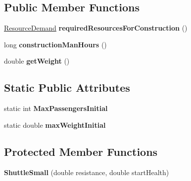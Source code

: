 \subsection*{Public Member Functions}
\begin{DoxyCompactItemize}
\item 
\hyperlink{classuniverse_1_1_resource_demand}{Resource\+Demand} {\bfseries required\+Resources\+For\+Construction} ()\hypertarget{classtools_1_1vehicles_1_1space_1_1_shuttle_small_a18f2b21e366f91dd860d8c3a95e6c82a}{}\label{classtools_1_1vehicles_1_1space_1_1_shuttle_small_a18f2b21e366f91dd860d8c3a95e6c82a}

\item 
long {\bfseries construction\+Man\+Hours} ()\hypertarget{classtools_1_1vehicles_1_1space_1_1_shuttle_small_a3baf783f477dabdb0041627ee22d6627}{}\label{classtools_1_1vehicles_1_1space_1_1_shuttle_small_a3baf783f477dabdb0041627ee22d6627}

\item 
double {\bfseries get\+Weight} ()\hypertarget{classtools_1_1vehicles_1_1space_1_1_shuttle_small_a73acb5fd8ec2ae344f5ef96d7608a7d4}{}\label{classtools_1_1vehicles_1_1space_1_1_shuttle_small_a73acb5fd8ec2ae344f5ef96d7608a7d4}

\end{DoxyCompactItemize}
\subsection*{Static Public Attributes}
\begin{DoxyCompactItemize}
\item 
static int {\bfseries Max\+Passengers\+Initial}\hypertarget{classtools_1_1vehicles_1_1space_1_1_shuttle_small_a79a98c3e688664027df0f2970e8631c0}{}\label{classtools_1_1vehicles_1_1space_1_1_shuttle_small_a79a98c3e688664027df0f2970e8631c0}

\item 
static double {\bfseries max\+Weight\+Initial}\hypertarget{classtools_1_1vehicles_1_1space_1_1_shuttle_small_a81be516ce311d69087b37a1e2d3ca80d}{}\label{classtools_1_1vehicles_1_1space_1_1_shuttle_small_a81be516ce311d69087b37a1e2d3ca80d}

\end{DoxyCompactItemize}
\subsection*{Protected Member Functions}
\begin{DoxyCompactItemize}
\item 
{\bfseries Shuttle\+Small} (double resistance, double start\+Health)\hypertarget{classtools_1_1vehicles_1_1space_1_1_shuttle_small_a376d35b57921f0c8afb4aac71c2dd462}{}\label{classtools_1_1vehicles_1_1space_1_1_shuttle_small_a376d35b57921f0c8afb4aac71c2dd462}

\end{DoxyCompactItemize}
